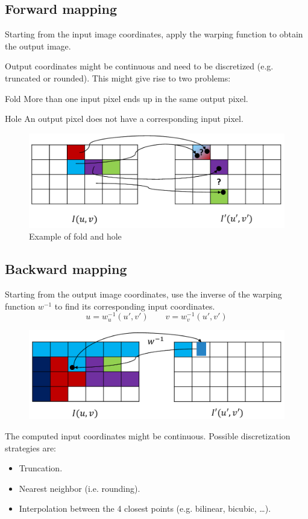 \subsection{Forward mapping}

Starting from the input image coordinates, apply the warping function to obtain the output image.

Output coordinates might be continuous and need to be discretized (e.g. truncated or rounded).
This might give rise to two problems:
\begin{descriptionlist}
    \item[Fold] More than one input pixel ends up in the same output pixel.
    \item[Hole] An output pixel does not have a corresponding input pixel.
\end{descriptionlist}

\begin{figure}[H]
    \centering
    \includegraphics[width=0.55\linewidth]{./img/_forward_warping.pdf}
    \caption{Example of fold and hole}
\end{figure}


\subsection{Backward mapping}

Starting from the output image coordinates, use the inverse of the warping function $w^{-1}$ to find its corresponding input coordinates.
\[ u = w_u^{-1}(u', v') \hspace{2em} v = w_v^{-1}(u', v') \]

\begin{figure}[H]
    \centering
    \includegraphics[width=0.55\linewidth]{./img/_backward_warping.pdf}
\end{figure}

The computed input coordinates might be continuous. Possible discretization strategies are:
\begin{itemize}
    \item Truncation.
    \item Nearest neighbor (i.e. rounding).
    \item Interpolation between the 4 closest points (e.g. bilinear, bicubic, \dots).
\end{itemize}